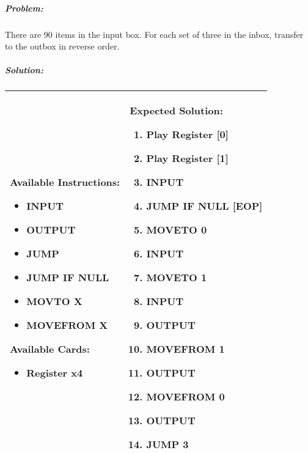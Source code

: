 \subparagraph{Problem:} There are 90 items in the input box. For each set of three in the inbox, transfer to the outbox in reverse order.

\subparagraph{Solution:} 
\begin{center}
    \begin{tabular}{ | m{5cm} | m{9cm} | } 
        \hline
            \textbf{Available Instructions:} 
            \begin{itemize}
                \item INPUT
                \item OUTPUT
                \item JUMP
                \item JUMP IF NULL
                \item MOVTO X
                \item MOVEFROM X
            \end{itemize}
            \textbf{Available Cards:} 
            \begin{itemize}
                \item Register x4
            \end{itemize}& 
            \textbf{Expected Solution:} 
            \begin{enumerate}
                \item Play Register [0]
                \item Play Register [1]
                \item INPUT
                \item JUMP IF NULL [EOP]
                \item MOVETO 0
                \item INPUT
                \item MOVETO 1
                \item INPUT
                \item OUTPUT
                \item MOVEFROM 1 
                \item OUTPUT
                \item MOVEFROM 0 
                \item OUTPUT
                \item JUMP 3
            \end{enumerate}
            \\
        \hline
    \end{tabular}
\end{center}


